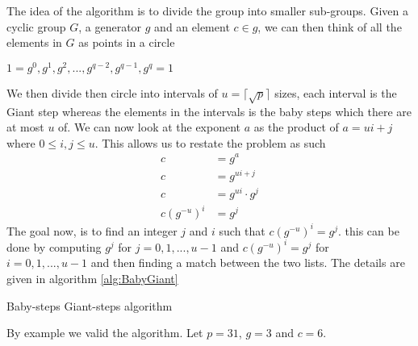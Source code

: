 \noindent
The idea of the algorithm is to divide the group into smaller sub-groups. Given a cyclic group $G$, a generator $g$ and an element $c \in g$, we can then think of all the elements in $G$ as points in a circle 

\begin{center}
    $1 = g^0, g^1, g^2,...,g^{q-2}, g^{q-1}, g^q = 1$
\end{center}

\noindent
We then divide then circle into intervals of $u = \lceil \sqrt{p} \rceil$ sizes, each interval is the Giant step whereas the elements in the intervals is the baby steps which there are at most $u$ of. We can now look at the exponent $a$ as the product of $a = ui + j$ where $0 \leq i,j \leq u$. This allows us to restate the problem as such
\begin{align*}
    c           &= g^a                  \\
    c           &= g^{ui + j}           \\ 
    c           &= g^{ui} \cdot g^{j}   \\
    c( g^{-u} )^i &= g^{j}                
\end{align*}
\noindent
The goal now, is to find an integer $j$ and $i$ such that $c( g^{-u} )^i = g^{j}$. this can be done by computing $g^{j}$ for $j = 0,1,...,u-1$ and $c( g^{-u} )^i = g^{j}$ for  $i = 0,1,...,u-1$ and then finding a match between the two lists. The details are given in algorithm \ref{alg:BabyGiant}

\begin{center}
\begin{algorithm}[H]
\caption{Baby-steps Giant-steps algorithm  \label{alg:BabyGiant}}



\end{algorithm}
\end{center}
\noindent
By example we valid the algorithm. Let $p = 31$, $g=3$ and $c = 6$.

